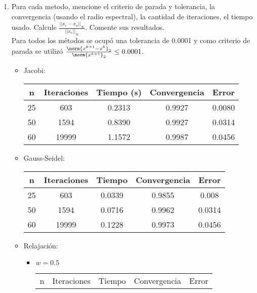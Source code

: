 \documentclass{udpreport}
\begin{document}
\begin{enumerate}
\begin{enumerate}
\begin{itemize}
\begin{itemize}
				\end{itemize}
			\end{itemize}
			\item Para cada metodo, mencione el criterio de parada y tolerancia, la convergencia (usando el radio espectral), la cantidad de iteraciones, el tiempo usado. Calcule $\frac{||x_{e}-x_{a}||_{\infty}}{||x_{e}||_{\infty}}$. Comente sus resultados.\\
			Para todos los métodos se ocupó una tolerancia de 0.0001 y como criterio de parada se utilizó $\frac{\norm{x^{k+1}-x^{k}}_{2}}{\norm{x^{k+1}}_{2}}\leq 0.0001$. 
			\begin{itemize}
				\item Jacobi:
					\begin{table}[H]
						\centering
						\begin{tabular}{|c|c|c|c|c|}
							\hline 
							n & Iteraciones & Tiempo (s) & Convergencia & Error \\
							\hline
							25 & 603 &0.2313 & 0.9927 & 0.0080 \\
							\hline
							50 & 1594 & 0.8390 & 0.9927 & 0.0314 \\
							\hline
							60 & 19999 & 1.1572 & 0.9987 & 0.0456 \\
							\hline
						\end{tabular}
					\end{table}
				\item Gauss-Seidel:
				 \begin{table}[H]
						\centering
						\begin{tabular}{|c|c|c|c|c|}
							\hline 
							n & Iteraciones & Tiempo & Convergencia & Error \\
							\hline
							25 &603 & 0.0339 & 0.9855 & 0.008 \\
							\hline
							50 & 1594 & 0.0716 & 0.9962 & 0.0314 \\
							\hline
							60 & 19999 & 0.1228 & 0.9973 & 0.0456 \\
							\hline
						\end{tabular}
					\end{table}
				\item Relajación:
					\begin{itemize}
					\item $w=0.5$
						\begin{table}[H]
						\centering
						\begin{tabular}{|c|c|c|c|c|}
							\hline 
							n & Iteraciones & Tiempo & Convergencia & Error \\

\end{tabular}
\end{table}
\end{itemize}
\end{itemize}
\end{enumerate}
\end{enumerate}
\end{document}

